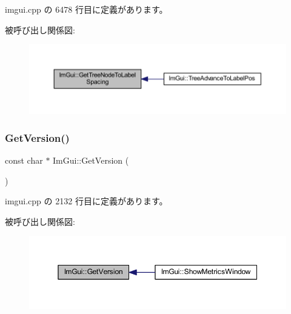  imgui.\+cpp の 6478 行目に定義があります。

被呼び出し関係図\+:\nopagebreak
\begin{figure}[H]
\begin{center}
\leavevmode
\includegraphics[width=350pt]{namespace_im_gui_a5c89cb6b42296d0f7db75027efc0fb7a_icgraph}
\end{center}
\end{figure}
\mbox{\label{namespace_im_gui_a6488c3cfa6331c8a1e93769e580ce020}} 
\subsubsection{\texorpdfstring{Get\+Version()}{GetVersion()}}
{\footnotesize\ttfamily const char $\ast$ Im\+Gui\+::\+Get\+Version (\begin{DoxyParamCaption}{ }\end{DoxyParamCaption})}



 imgui.\+cpp の 2132 行目に定義があります。

被呼び出し関係図\+:\nopagebreak
\begin{figure}[H]
\begin{center}
\leavevmode
\includegraphics[width=350pt]{namespace_im_gui_a6488c3cfa6331c8a1e93769e580ce020_icgraph}
\end{center}
\end{figure}
\mbox{\label{namespace_im_gui_a96ce6060592d3ef975594357e650adc6}} 
